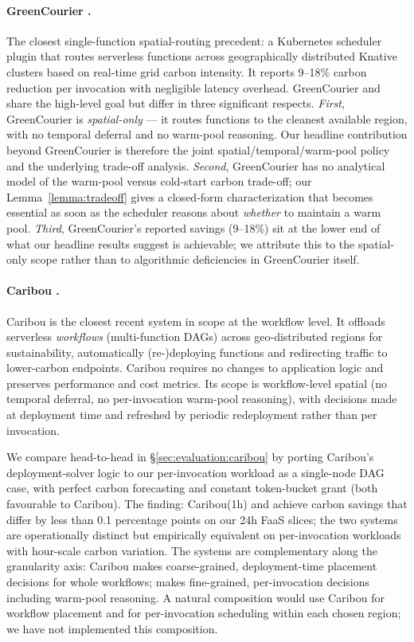 \paragraph{GreenCourier \citep{chadha2023greencourier}.} The closest
single-function spatial-routing precedent: a Kubernetes scheduler
plugin that routes serverless functions across geographically
distributed Knative clusters based on real-time grid carbon intensity.
It reports 9--18\% carbon reduction per invocation with negligible
latency overhead. GreenCourier and \GreenFaaS{} share the high-level
goal but differ in three significant respects.
\emph{First}, GreenCourier is \emph{spatial-only} --- it routes
functions to the cleanest available region, with no temporal deferral
and no warm-pool reasoning. Our headline contribution beyond
GreenCourier is therefore the joint spatial/temporal/warm-pool policy
and the underlying trade-off analysis.
\emph{Second}, GreenCourier has no analytical model of the warm-pool
versus cold-start carbon trade-off; our Lemma~\ref{lemma:tradeoff}
gives a closed-form characterization that becomes essential as soon
as the scheduler reasons about \emph{whether} to maintain a warm
pool.
\emph{Third}, GreenCourier's reported savings (9--18\%) sit at the
lower end of what our headline results suggest is achievable; we
attribute this to the spatial-only scope rather than to algorithmic
deficiencies in GreenCourier itself.

\paragraph{Caribou \citep{gsteiger2024caribou}.} Caribou is the
closest recent system in scope at the workflow level. It offloads
serverless \emph{workflows} (multi-function DAGs) across
geo-distributed regions for sustainability, automatically
(re-)deploying functions and redirecting traffic to lower-carbon
endpoints. Caribou requires no changes to application logic and
preserves performance and cost metrics. Its scope is workflow-level
spatial (no temporal deferral, no per-invocation warm-pool
reasoning), with decisions made at deployment time and refreshed by
periodic redeployment rather than per invocation.

We compare head-to-head in \S\ref{sec:evaluation:caribou} by porting
Caribou's deployment-solver logic to our per-invocation workload as
a single-node DAG case, with perfect carbon forecasting and constant
token-bucket grant (both favourable to Caribou). The finding:
Caribou(1h) and \GreenFaaS{} achieve carbon savings that differ by less than 0.1 percentage points
on our 24h FaaS slices; the two systems are operationally distinct
but empirically equivalent on per-invocation workloads with hour-scale
carbon variation. The systems are complementary along the granularity
axis: Caribou makes coarse-grained, deployment-time placement decisions
for whole workflows; \GreenFaaS{} makes fine-grained, per-invocation
decisions including warm-pool reasoning. A natural composition would
use Caribou for workflow placement and \GreenFaaS{} for per-invocation
scheduling within each chosen region; we have not implemented this
composition.

